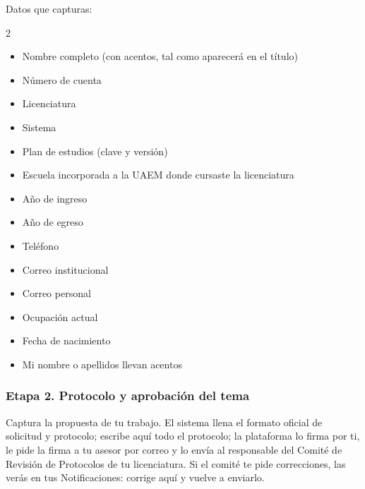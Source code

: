Datos que capturas:
\begin{multicols}{2}\small
\begin{itemize}
  \item Nombre completo (con acentos, tal como aparecerá en el título)
  \item Número de cuenta
  \item Licenciatura
  \item Sistema
  \item Plan de estudios (clave y versión)
  \item Escuela incorporada a la UAEM donde cursaste la licenciatura
  \item Año de ingreso
  \item Año de egreso
  \item Teléfono
  \item Correo institucional
  \item Correo personal
  \item Ocupación actual
  \item Fecha de nacimiento
  \item Mi nombre o apellidos llevan acentos
\end{itemize}
\end{multicols}
\subsubsection*{Etapa 2. Protocolo y aprobación del tema}
Captura la propuesta de tu trabajo. El sistema llena el formato oficial de solicitud y protocolo; escribe aquí todo el protocolo; la plataforma lo firma por ti, le pide la firma a tu asesor por correo y lo envía al responsable del Comité de Revisión de Protocolos de tu licenciatura. Si el comité te pide correcciones, las verás en tus Notificaciones: corrige aquí y vuelve a enviarlo.

